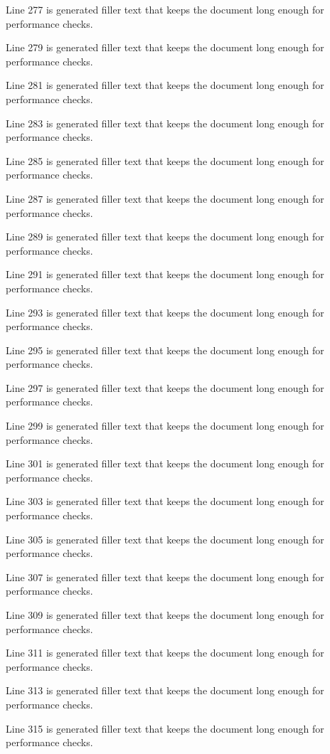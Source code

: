 Line 277 is generated filler text that keeps the document long enough for performance checks.

Line 279 is generated filler text that keeps the document long enough for performance checks.

Line 281 is generated filler text that keeps the document long enough for performance checks.

Line 283 is generated filler text that keeps the document long enough for performance checks.

Line 285 is generated filler text that keeps the document long enough for performance checks.

Line 287 is generated filler text that keeps the document long enough for performance checks.

Line 289 is generated filler text that keeps the document long enough for performance checks.

Line 291 is generated filler text that keeps the document long enough for performance checks.

Line 293 is generated filler text that keeps the document long enough for performance checks.

Line 295 is generated filler text that keeps the document long enough for performance checks.

Line 297 is generated filler text that keeps the document long enough for performance checks.

Line 299 is generated filler text that keeps the document long enough for performance checks.

Line 301 is generated filler text that keeps the document long enough for performance checks.

Line 303 is generated filler text that keeps the document long enough for performance checks.

Line 305 is generated filler text that keeps the document long enough for performance checks.

Line 307 is generated filler text that keeps the document long enough for performance checks.

Line 309 is generated filler text that keeps the document long enough for performance checks.

Line 311 is generated filler text that keeps the document long enough for performance checks.

Line 313 is generated filler text that keeps the document long enough for performance checks.

Line 315 is generated filler text that keeps the document long enough for performance checks.

